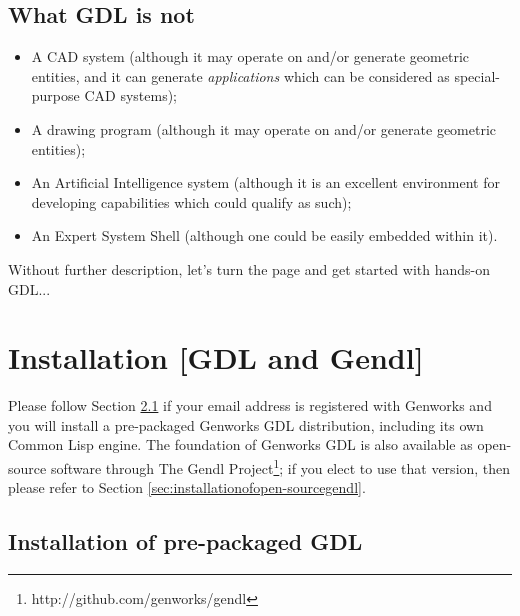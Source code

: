 \documentclass [11pt]{book}
\begin{document}
\section{What GDL is not}

\label{sec:whatgdlisnot}



\begin{itemize}

\item A CAD system (although it may operate on and/or generate geometric entities, and it can generate \emph{applications} which can be considered as special-purpose CAD systems);

\item A drawing program (although it may operate on and/or generate geometric entities);

\item An Artificial Intelligence system (although it is an
excellent environment for developing capabilities which could qualify
as such);

\item An Expert System Shell (although one could be easily embedded within it).

\end{itemize}

Without further description, let's turn the page and get
      started with hands-on GDL...

\chapter{Installation [GDL and Gendl]}

\label{chap:installation[gdlandgendl]}

Please follow Section 
\ref{sec:installationofpre-packagedgdl} if your email address is registered with Genworks and you will
install a pre-packaged Genworks GDL distribution, including its own
Common Lisp engine.  The foundation of Genworks GDL is also available
as open-source software through The Gendl Project\footnote{http://github.com/genworks/gendl}; if you elect to use that version, then please refer to Section 
\ref{sec:installationofopen-sourcegendl}.

\section{Installation of pre-packaged GDL}

\label{sec:installationofpre-packagedgdl}
\end{document}
